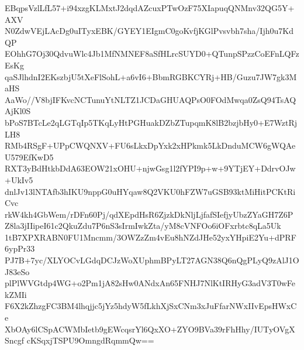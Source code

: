 EBqpsVzlLfL57+i94xzgKLMxtJ2dqdAZcuxPTwOzF75XIapuqQNMnv32QG5Y+AXV
N0ZdwVEjLAcDg0uITyxEBK/GYEY1EIgmC0goKvfjKGlPvsvbh7sha/Ijh0u7KdQP
EOhhG7Oj30QdvuWlc4Jb1MfNMNEF8aSfHLrcSUYD0+QTunpSPzzCoEFnLQFzEsKg
qaSJlhdnI2EKszbjU5tXeFlSohL+a6vI6+BbmRGBKCYRj+HB/Guzu7JW7gk3MaHS
AaWo//V8bjIFKvcNCTunuYtNLTZ1JCDaGHUAQPsO0FOdMwqa0ZsQ94TsAQAjKl0S
bPoS7BTcLe2qLGTqIp5TKqLyHtPGHuakDZbZTupqmK8lB2bzjbHy0+E7WztRjLH8
RMb4RSgF+UPpCWQNXV+FU6sLkxDpYxk2xHPkmk5LkDnduMCW6gWQAeU579EfKwD5
RXT3yBdHtkbDdA63EOW21xOHU+njwGsg1l2fYPI9p+w+9YTjEY+DdrvOJw+UkIv5
dnlJv13lNTAfb3hIKU9nppG0uHYqaw8Q2VKU0hFZW7uGSB93ktMiHitPCKtRiCvc
rkW4kh4GbWem/rDFn60Pj/qdXEpdHsR6ZjzkDkNljLjfafSIefjyUbzZYaGH7Z6P
Z8la3jIIipeI61c2QkuZdu7P6nS3sIrmIwkZta/yM8cVNFOo6iOFxrbtc8qLa5Uk
1tB7XPXRABN0FU1Mncmm/3OWZzZm4vEu8hNZdJHe52yxYHpiE2Yu+dPRF6ypPr33
PJ7B+7yc/XLYOCvLGdqDCJzWoXUphmBPyLT27AGN38Q6nQgPLyQ9zAlJ1OJ83eSo
plPlWVGtdp4WG+o2Pm1jA82sHw0ANdxAn65FNHJ7NlKtIRHyG3adV3T0wFekZMIi
F6X2kZhzgFC3BM4lhqjjc5jYz5hdyW5fLkhXjSxCNm3xJuFfarNWxIIvEpsHWxCe
XbOAy6lCSpACWMbIetb9gEWcqsrYl6QxXO+ZYO9BVa39rFhHhy/IUTyOVgXSncgf
cKSqxjTSPU9OmngdRqmmQw==
